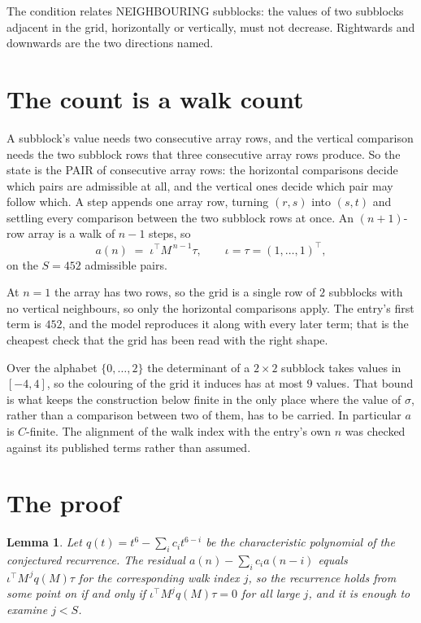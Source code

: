 \documentclass[11pt,a4paper]{article}
\theoremstyle{plain}
\newtheorem{lemma}[theorem]{Lemma}
\theoremstyle{definition}
\begin{document}
The condition relates NEIGHBOURING subblocks: the values of two subblocks adjacent in the grid,
horizontally or vertically, must not decrease. Rightwards and downwards are the two directions named.

\section{The count is a walk count}

A subblock's value needs two consecutive array rows, and the vertical
comparison needs the two subblock rows that three consecutive array rows produce. So the state
is the PAIR of consecutive array rows: the horizontal comparisons decide which pairs are
admissible at all, and the vertical ones decide which pair may follow which. A step appends one
array row, turning $(r,s)$ into $(s,t)$ and settling every comparison between the two subblock
rows at once. An $(n+1)$-row array is a walk of $n-1$ steps, so
\[
a(n)\;=\;\iota^{\!\top}M^{\,n-1}\tau,\qquad\iota=\tau=(1,\dots,1)^{\!\top},
\]
on the $S=452$ admissible pairs.

At $n=1$ the array has two rows, so the grid is a single row of $2$
subblocks with no vertical neighbours, so only the horizontal comparisons apply. The
entry's first term is $452$, and the model reproduces it along with every later term; that
is the cheapest check that the grid has been read with the right shape.

Over the alphabet $\{0,\dots,2\}$ the determinant of a $2\times2$ subblock takes values in
$[-4,4]$, so the colouring of the grid it induces has at most $9$ values.
That bound is what keeps the construction below finite in the only place where the value of
$\sigma$, rather than a comparison between two of them, has to be carried.
In particular $a$ is $C$-finite. The alignment of the walk index with the entry's own $n$ was
checked against its published terms rather than assumed.

\section{The proof}

\begin{lemma}\label{lem:crit}
Let $q(t)=t^{6}-\sum_i c_it^{6-i}$ be the characteristic polynomial of the
conjectured recurrence. The residual $a(n)-\sum_ic_ia(n-i)$ equals
$\iota^{\!\top}M^{\,j}q(M)\tau$ for the corresponding walk index $j$, so the recurrence
holds from some point on if and only if $\iota^{\!\top}M^{j}q(M)\tau=0$ for all large $j$,
and it is enough to examine $j<S$.
\end{lemma}
\end{document}
